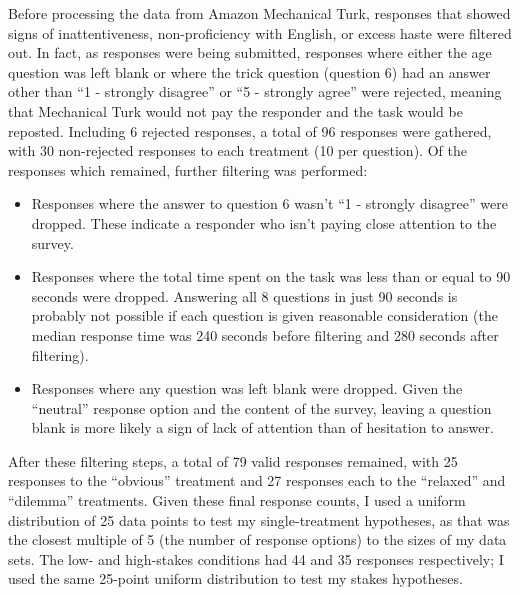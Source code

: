 Before processing the data from Amazon Mechanical Turk, responses that showed signs of inattentiveness, non-proficiency with English, or excess haste were filtered out.
%
In fact, as responses were being submitted, responses where either the age question was left blank or where the trick question (question 6) had an answer other than ``1 - strongly disagree'' or ``5 - strongly agree'' were rejected, meaning that Mechanical Turk would not pay the responder and the task would be reposted.
%
Including 6 rejected responses, a total of 96 responses were gathered, with 30 non-rejected responses to each treatment (10 per question).
%
Of the responses which remained, further filtering was performed:
%
\begin{itemize}
  \item Responses where the answer to question 6 wasn't ``1 - strongly disagree'' were dropped. These indicate a responder who isn't paying close attention to the survey.
  \item Responses where the total time spent on the task was less than or equal to 90 seconds were dropped. Answering all 8 questions in just 90 seconds is probably not possible if each question is given reasonable consideration (the median response time was 240 seconds before filtering and 280 seconds after filtering).
  \item Responses where any question was left blank were dropped. Given the ``neutral'' response option and the content of the survey, leaving a question blank is more likely a sign of lack of attention than of hesitation to answer.
\end{itemize}
%
After these filtering steps, a total of 79 valid responses remained, with 25 responses to the ``obvious'' treatment and 27 responses each to the ``relaxed'' and ``dilemma'' treatments.
%
Given these final response counts, I used a uniform distribution of 25 data points to test my single-treatment hypotheses, as that was the closest multiple of 5 (the number of response options) to the sizes of my data sets.
%
The low- and high-stakes conditions had 44 and 35 responses respectively; I used the same 25-point uniform distribution to test my stakes hypotheses.


